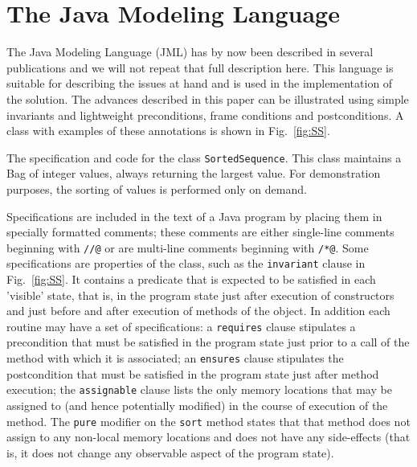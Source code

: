 \documentclass{sig-alternate}
\begin{document}
\section{The Java Modeling Language}

The Java Modeling Language (JML) has by now been described in several publications
\cite{Leavens-Baker-Ruby99b,Leavens-Baker-Ruby02,jmlpapers} and we will not repeat that full description here.  This language is suitable for
describing the issues at hand and is used in the implementation of the solution.
 The advances described in this paper
can be illustrated using simple invariants and lightweight preconditions,
frame conditions and postconditions.  
A class with examples of these annotations is shown in Fig.~\ref{fig:SS}.

\begin{BFIGURE}

\caption{The specification and code for the class \texttt{SortedSequence}.  This class maintains a Bag of integer values, always returning the largest value.  For demonstration purposes, 
the sorting of values is performed only on demand.}
\label{fig:SS}
\end{BFIGURE}

Specifications are included in the text of a Java program by placing them in 
specially formatted comments; these comments are either single-line comments
beginning with  \texttt{//@} or are multi-line comments beginning with  \texttt{/*@}.
Some specifications are properties of the class, such as the \texttt{invariant} clause
in Fig.~\ref{fig:SS}.
It contains a predicate that is expected to be satisfied in 
each 'visible' state, that is, in the program state just after execution of constructors and
just before and after execution of methods of the object.  In addition each routine may
have a set of specifications: a \texttt{requires} clause 
stipulates a precondition that must be satisfied in the program state just prior to a call
of the method with which it is associated; an \texttt{ensures} clause stipulates the 
postcondition that must be satisfied in the program state just after method execution;
the \texttt{assignable} clause lists the only memory locations that may be assigned to (and hence 
potentially modified) in the course of execution of the method.  The \texttt{pure} modifier on the \texttt{sort} method states that that method does not assign to any non-local memory locations
and does not have any side-effects (that is, it does not change any observable aspect of 
the program state).
\end{document}
